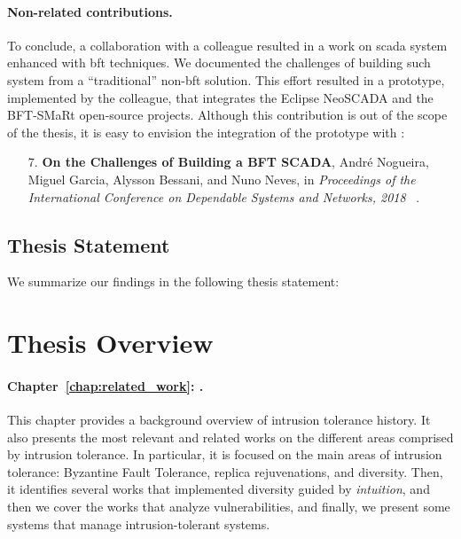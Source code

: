\paragraph{Non-related contributions.}
To conclude, a collaboration with a colleague resulted in a work on \gls{scada} system enhanced with \gls{bft} techniques. 
We documented the challenges of building such system from a ``traditional'' non-\gls{bft} solution.
This effort resulted in a prototype, implemented by the colleague, that integrates the Eclipse NeoSCADA and the BFT-SMaRt open-source projects.
Although this contribution is out of the scope of the thesis, it is easy to envision the integration of the prototype with \system:


\begin{enumerate}

\item[7.] \textbf{On the Challenges of Building a BFT SCADA}, Andr\'{e} Nogueira, Miguel Garcia, Alysson Bessani, and Nuno Neves, in \emph{Proceedings of the International Conference on Dependable Systems and Networks, 2018 }~\cite{Nogueira:2018}.
\end{enumerate}


\subsection{Thesis Statement}
We summarize our findings in the following thesis statement:

\vspace{2mm}

\section{Thesis Overview}
\paragraph{Chapter~\ref{chap:related_work}: .}
This chapter provides a background overview of intrusion tolerance history. 
It also presents the most relevant and related works on the different areas comprised by intrusion tolerance.
In particular, it is focused on the main areas of intrusion tolerance: Byzantine Fault Tolerance, replica rejuvenations, and diversity.
Then, it identifies several works that implemented diversity guided by \emph{intuition}, and then we cover the works that analyze vulnerabilities, and finally, we present some systems that manage intrusion-tolerant systems.


